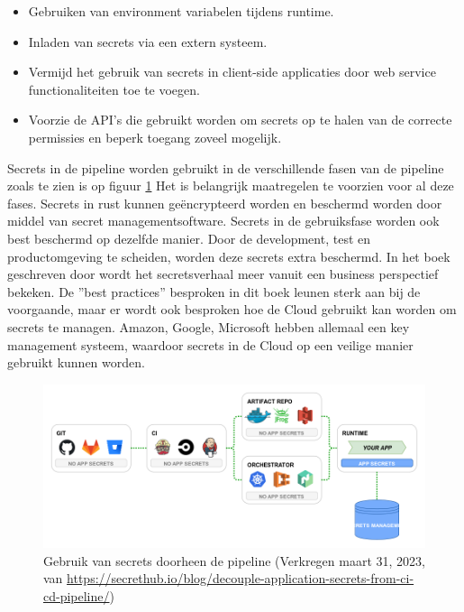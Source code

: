 \begin{itemize}
  \item Gebruiken van environment variabelen tijdens runtime.
  \item Inladen van secrets via een extern systeem.
  \item Vermijd het gebruik van secrets in client-side applicaties door web service functionaliteiten toe te voegen.
  \item Voorzie de API's die gebruikt worden om secrets op te halen van de correcte permissies en beperk toegang zoveel mogelijk.
\end{itemize}

Secrets in de pipeline worden gebruikt in de verschillende fasen van de pipeline zoals te zien is op figuur \ref{fig:Pipelinesecrets} Het is belangrijk maatregelen te voorzien voor al deze fases. Secrets in rust kunnen geëncrypteerd worden en beschermd worden door middel van secret managementsoftware. Secrets in de gebruiksfase worden ook best beschermd op dezelfde manier. Door de development, test en productomgeving te scheiden, worden deze secrets extra beschermd. \autocite{Basak2022} In het boek geschreven door \textcite{Calles2020} wordt het secretsverhaal meer vanuit een business perspectief bekeken. De ''best practices'' besproken in dit boek leunen sterk aan bij de voorgaande, maar er wordt ook besproken hoe de Cloud gebruikt kan worden om secrets te managen. Amazon, Google, Microsoft hebben allemaal een key management systeem, waardoor secrets in de Cloud op een veilige manier gebruikt kunnen worden.

\begin{figure}[H]
  \centering
  \includegraphics[scale=0.4]{graphics/Pipelinesecrets.png}
  \caption{\label{fig:Pipelinesecrets}Gebruik van secrets doorheen de pipeline (Verkregen maart 31, 2023, van \url{https://secrethub.io/blog/decouple-application-secrets-from-ci-cd-pipeline/})}
\end{figure}

